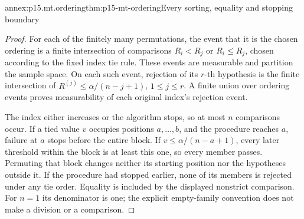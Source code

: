 \begin{annexitem}{annex:p15.mt.ordering}{thm:p15-mt-ordering}{Every sorting, equality and stopping boundary}
\begin{proof}
For each of the finitely many permutations, the event that it is the
chosen ordering is a finite intersection of comparisons \(R_i<R_j\)
or \(R_i\leq R_j\), chosen according to the fixed index tie rule.
These events are measurable and partition the sample space.
On each such event, rejection of its \(r\)-th hypothesis is the finite
intersection of \(R^{(j)}\leq\alpha/(n-j+1)\), \(1\leq j\leq r\).
A finite union over ordering events proves measurability of each
original index's rejection event.

The index either increases or the algorithm stops, so at most \(n\)
comparisons occur. If a tied value \(v\) occupies positions \(a,\ldots,b\),
and the procedure reaches \(a\), failure at \(a\) stops before the entire
block. If \(v\leq\alpha/(n-a+1)\), every later threshold within the
block is at least this one, so every member passes. Permuting that block
changes neither its starting position nor the hypotheses outside it.
If the procedure had stopped earlier, none of its members is rejected
under any tie order. Equality is included by the displayed nonstrict
comparison. For \(n=1\) its denominator is one; the explicit empty-family
convention does not make a division or a comparison.
\end{proof}
\end{annexitem}


